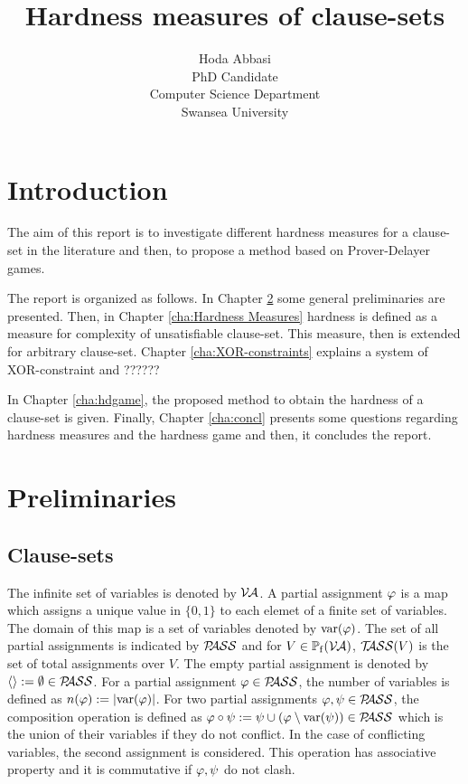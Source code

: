 \documentclass[]{book}
\begin{document}
\title{Hardness measures of clause-sets}

\author{Hoda Abbasi\\
        PhD Candidate\\
        Computer Science Department\\
        Swansea University\\}
\maketitle

\tableofcontents
\chapter{Introduction}
\label{cha:Introduction}

The aim of this report is to investigate different hardness measures for a clause-set in the literature and then, to propose a method based on Prover-Delayer games. 

The report is organized as follows. In Chapter \ref{cha:Preliminaries} some general preliminaries are presented. Then, in Chapter \ref{cha:Hardness Measures} hardness is defined as a measure for complexity of unsatisfiable clause-set. This measure, then is extended for arbitrary clause-set. Chapter \ref{cha:XOR-constraints} explains a system of XOR-constraint and ??????

In Chapter \ref{cha:hdgame}, the proposed method to obtain the hardness of a clause-set is given. Finally, Chapter \ref{cha:concl} presents some questions regarding hardness measures and the hardness game and then, it concludes the report.
\chapter{Preliminaries}
\label{cha:Preliminaries}

\section{Clause-sets}
\label{sec:Clause-sets}

The infinite set of variables is denoted by $\mathcal{V\hspace{-0.1em}A}$. A partial assignment $\varphi$ is a map which assigns a unique value in $\{0,1\}$ to each elemet of a finite set of variables. The domain of this map is a set of variables denoted by $\operatorname{var}(\varphi)$. The set of all partial assignments is indicated by $\mathcal{P\hspace{-0.32em}ASS}$ and for $V \in \operatorname{\mathbb{P}_f}(\mathcal{V\hspace{-0.1em}A})$, $\mathcal{T\hspace{-0.35em}ASS}(V)$ is the set of total assignments over $V$. The empty partial assignment is denoted by $\langle  \rangle:= \emptyset \in \mathcal{P\hspace{-0.32em}ASS}$. For a partial assignment $\varphi \in \mathcal{P\hspace{-0.32em}ASS}$, the number of variables is defined as $n(\varphi):=\lvert \operatorname{var}(\varphi) \rvert$. For two partial assignments $\varphi, \psi \in \mathcal{P\hspace{-0.32em}ASS}$, the composition operation is defined as $\varphi \circ \psi := \psi \cup (\varphi \setminus \operatorname{var}(\psi)) \in \mathcal{P\hspace{-0.32em}ASS}$ which is the union of their variables if they do not conflict. In the case of conflicting variables, the second assignment is considered. This operation has associative property and it is commutative if $\varphi, \psi$ do not clash.
\end{document}
